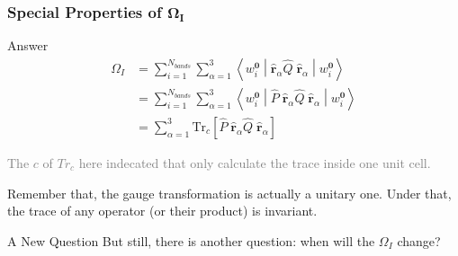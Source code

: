 \documentclass{beamer}
\begin{document}
  \begin{frame}
    \frametitle{Special Properties of \(\mathbf{\Omega_I}\)}

    \begin{block}{Answer}
      \small
      \begin{equation*}
        \begin{aligned}
          \Omega_I &= \sum_{i=1}^{N_{bands}}\sum_{\alpha=1}^3\left\langle{}w_i^{\mathbf{0}}\middle|\widehat{\mathbf{r}}_\alpha\widehat{Q}\;\widehat{\mathbf{r}}_\alpha\middle|{}w_i^\mathbf{0}\right\rangle\\
          &= \sum_{i=1}^{N_{bands}}\sum_{\alpha=1}^3\left\langle{}w_i^{\mathbf{0}}\middle|\widehat{P}\;\widehat{\mathbf{r}}_\alpha\widehat{Q}\;\widehat{\mathbf{r}}_\alpha\middle|{}w_i^\mathbf{0}\right\rangle\\
          &= \sum_{\alpha=1}^3\mathrm{Tr}_c\left[\widehat{P}\;\widehat{\mathbf{r}}_\alpha\widehat{Q}\;\widehat{\mathbf{r}}_\alpha\right]
        \end{aligned}
      \end{equation*} 

      \textcolor{gray}{The \(c\) of \(Tr_c\) here indecated that only calculate the trace inside one unit cell.}

      Remember that, the gauge transformation is actually a unitary one. Under that, the trace of any operator (or their product) is invariant. 
    \end{block}

    \begin{alertblock}{A New Question}
      But still, there is another question: when will the \(\Omega_I\) change?
    \end{alertblock}

  \end{frame}
\end{document}
